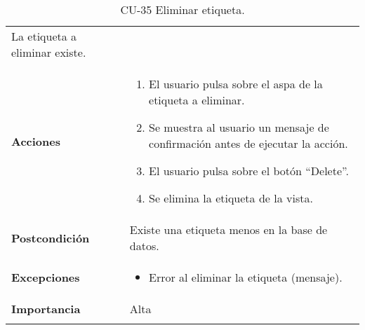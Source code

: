\begin{longtable}[]{@{}ll@{}}
\begin{minipage}[t]{0.72\columnwidth}
La etiqueta a eliminar existe.\strut
\end{minipage}\tabularnewline
\begin{minipage}[t]{0.22\columnwidth}\raggedright
\textbf{Acciones}\strut
\end{minipage} & \begin{minipage}[t]{0.72\columnwidth}\raggedright
\begin{enumerate}
\def\labelenumi{\arabic{enumi}.}
\tightlist
\item
  El usuario pulsa sobre el aspa de la etiqueta a eliminar.
\item
  Se muestra al usuario un mensaje de confirmación antes de ejecutar la
  acción.
\item
  El usuario pulsa sobre el botón ``Delete''.
\item
  Se elimina la etiqueta de la vista.
\end{enumerate}\strut
\end{minipage}\tabularnewline
\begin{minipage}[t]{0.22\columnwidth}\raggedright
\textbf{Postcondición}\strut
\end{minipage} & \begin{minipage}[t]{0.72\columnwidth}\raggedright
Existe una etiqueta menos en la base de datos.\strut
\end{minipage}\tabularnewline
\begin{minipage}[t]{0.22\columnwidth}\raggedright
\textbf{Excepciones}\strut
\end{minipage} & \begin{minipage}[t]{0.72\columnwidth}\raggedright
\begin{itemize}
\tightlist
\item
  Error al eliminar la etiqueta (mensaje).
\end{itemize}\strut
\end{minipage}\tabularnewline
\begin{minipage}[t]{0.22\columnwidth}\raggedright
\textbf{Importancia}\strut
\end{minipage} & \begin{minipage}[t]{0.72\columnwidth}\raggedright
Alta\strut
\end{minipage}\tabularnewline
\bottomrule
\caption{CU-35 Eliminar etiqueta.}
\end{longtable}

